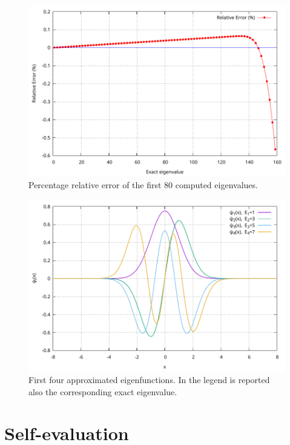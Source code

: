 \documentclass[11pt,a4paper]{article}
\begin{document}
\begin{figure}
    \centering
	\includegraphics[width=0.95\linewidth]{EigenvaluesError.pdf}
	\caption{Percentage relative error of the first 80 computed eigenvalues.}
	\label{fig:EigValsErr}
\end{figure}

\begin{figure}
	\centering
	\includegraphics[width=0.95\linewidth]{Eigenfunctions.pdf}
	\caption{First four approximated eigenfunctions. In the legend is reported also the corresponding exact eigenvalue.}
	\label{fig:EigFuncs}
\end{figure}

\section{Self-evaluation} %
\end{document}
